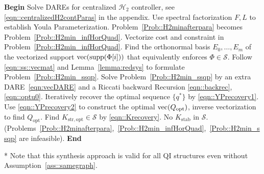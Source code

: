 \begin{algorithm}
\caption{Optimal structured controller solution}\label{alg::optcontroller}
\begin{algorithmic}[1]
\State \textbf{Begin}
\State Solve DAREs for centralized \(\mathcal{H}_2\) controller, see \eqref{eqn::centralizedH2contParas} in the appendix. Use spectral factorization \(F,L\) to establish Youla Parameterization. Problem~\ref{Prob::H2minafterpara} becomes Problem~\ref{Prob::H2min_infHorQuad}. 
\State Vectorize cost and constraint in Problem~\ref{Prob::H2min_infHorQuad}. 
Find the orthonormal basis \(E_0,\hdots,E_m\) of the vectorized support \({\mathrm{vec}}({\mathrm{supp}}(\Phi[i]))\) that equivalently enforces \(\Phi \in \mathcal{S}\). Follow \eqref{eqn::ss::vecmat} and Lemma~\ref{lemma:redsys} to formulate Problem~\ref{Prob::H2min_ssqp}.
\State Solve Problem~\ref{Prob::H2min_ssqp} by an extra DARE~\eqref{eqn:vecDARE} and a Riccati backward Recursion \eqref{eqn::backrec}, \eqref{eqn::optu0}.
\State Iteratively recover the optimal sequence \(\{q^*\}\) by \eqref{eqn::YPrecovery1}. Use \eqref{eqn::YPrecovery2} to construct the optimal \({\mathrm{vec}}(Q_\mathrm{opt})\), inverse vectorization to find \(Q_\mathrm{opt}\). Find \(K_\mathrm{str, opt} \in \mathcal{S}\) by \eqref{eqn::Krecovery}.
\Else
\State No \(K_{\mathrm{stab}}\) in \(\mathcal{S}\). (Problems~\ref{Prob::H2minafterpara},~\ref{Prob::H2min_infHorQuad},~\ref{Prob::H2min_ssqp} are infeasible).
\EndIf
\State \textbf{End}
\end{algorithmic}
* Note that this synthesis approach is valid for all QI structures even without Assumption~\ref{ass::samegraph}.
\end{algorithm}


